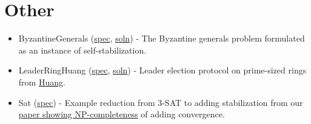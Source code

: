 \section{Other}

\begin{itemize}
\item ByzantineGenerals (\href{examplespec/ByzantineGenerals.prot}{spec}, \href{examplesoln/ByzantineGenerals.prot}{soln})
- The Byzantine generals problem formulated as an instance of self-stabilization.
\item LeaderRingHuang (\href{examplespec/LeaderRingHuang.prot}{spec}, \href{examplesoln/LeaderRingHuang.prot}{soln})
- Leader election protocol on prime-sized rings from \href{http://dx.doi.org/10.1145/169683.174161}{Huang}.
\item Sat (\href{examplespec/Sat.prot}{spec})
- Example reduction from 3-SAT to adding stabilization from our \href{http://dx.doi.org/10.1007/978-3-642-40213-5_2}{paper showing NP-completeness} of adding convergence.
\end{itemize}



